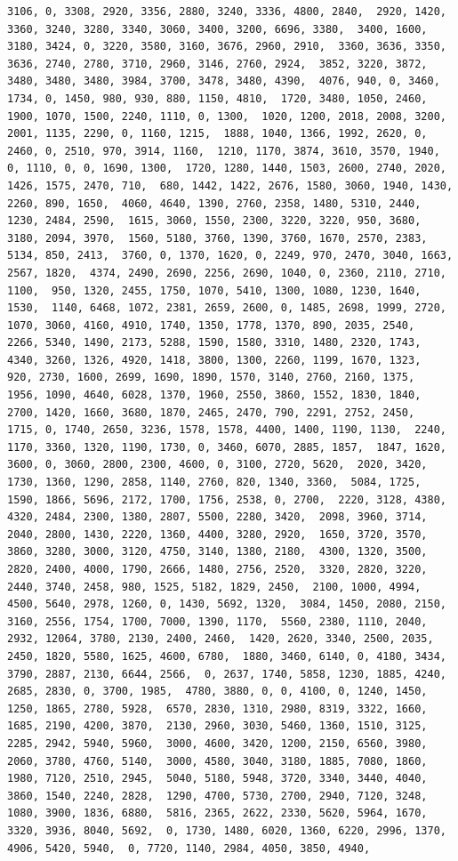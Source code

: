 \documentclass[
]{article}
\begin{document}
\begin{verbatim}
3106, 0, 3308, 2920, 3356, 2880, 3240, 3336, 4800, 2840,  2920, 1420, 3360, 3240, 3280, 3340, 3060, 3400, 3200, 6696, 3380,  3400, 1600, 3180, 3424, 0, 3220, 3580, 3160, 3676, 2960, 2910,  3360, 3636, 3350, 3636, 2740, 2780, 3710, 2960, 3146, 2760, 2924,  3852, 3220, 3872, 3480, 3480, 3480, 3984, 3700, 3478, 3480, 4390,  4076, 940, 0, 3460, 1734, 0, 1450, 980, 930, 880, 1150, 4810,  1720, 3480, 1050, 2460, 1900, 1070, 1500, 2240, 1110, 0, 1300,  1020, 1200, 2018, 2008, 3200, 2001, 1135, 2290, 0, 1160, 1215,  1888, 1040, 1366, 1992, 2620, 0, 2460, 0, 2510, 970, 3914, 1160,  1210, 1170, 3874, 3610, 3570, 1940, 0, 1110, 0, 0, 1690, 1300,  1720, 1280, 1440, 1503, 2600, 2740, 2020, 1426, 1575, 2470, 710,  680, 1442, 1422, 2676, 1580, 3060, 1940, 1430, 2260, 890, 1650,  4060, 4640, 1390, 2760, 2358, 1480, 5310, 2440, 1230, 2484, 2590,  1615, 3060, 1550, 2300, 3220, 3220, 950, 3680, 3180, 2094, 3970,  1560, 5180, 3760, 1390, 3760, 1670, 2570, 2383, 5134, 850, 2413,  3760, 0, 1370, 1620, 0, 2249, 970, 2470, 3040, 1663, 2567, 1820,  4374, 2490, 2690, 2256, 2690, 1040, 0, 2360, 2110, 2710, 1100,  950, 1320, 2455, 1750, 1070, 5410, 1300, 1080, 1230, 1640, 1530,  1140, 6468, 1072, 2381, 2659, 2600, 0, 1485, 2698, 1999, 2720,  1070, 3060, 4160, 4910, 1740, 1350, 1778, 1370, 890, 2035, 2540,  2266, 5340, 1490, 2173, 5288, 1590, 1580, 3310, 1480, 2320, 1743,  4340, 3260, 1326, 4920, 1418, 3800, 1300, 2260, 1199, 1670, 1323,  920, 2730, 1600, 2699, 1690, 1890, 1570, 3140, 2760, 2160, 1375,  1956, 1090, 4640, 6028, 1370, 1960, 2550, 3860, 1552, 1830, 1840,  2700, 1420, 1660, 3680, 1870, 2465, 2470, 790, 2291, 2752, 2450,  1715, 0, 1740, 2650, 3236, 1578, 1578, 4400, 1400, 1190, 1130,  2240, 1170, 3360, 1320, 1190, 1730, 0, 3460, 6070, 2885, 1857,  1847, 1620, 3600, 0, 3060, 2800, 2300, 4600, 0, 3100, 2720, 5620,  2020, 3420, 1730, 1360, 1290, 2858, 1140, 2760, 820, 1340, 3360,  5084, 1725, 1590, 1866, 5696, 2172, 1700, 1756, 2538, 0, 2700,  2220, 3128, 4380, 4320, 2484, 2300, 1380, 2807, 5500, 2280, 3420,  2098, 3960, 3714, 2040, 2800, 1430, 2220, 1360, 4400, 3280, 2920,  1650, 3720, 3570, 3860, 3280, 3000, 3120, 4750, 3140, 1380, 2180,  4300, 1320, 3500, 2820, 2400, 4000, 1790, 2666, 1480, 2756, 2520,  3320, 2820, 3220, 2440, 3740, 2458, 980, 1525, 5182, 1829, 2450,  2100, 1000, 4994, 4500, 5640, 2978, 1260, 0, 1430, 5692, 1320,  3084, 1450, 2080, 2150, 3160, 2556, 1754, 1700, 7000, 1390, 1170,  5560, 2380, 1110, 2040, 2932, 12064, 3780, 2130, 2400, 2460,  1420, 2620, 3340, 2500, 2035, 2450, 1820, 5580, 1625, 4600, 6780,  1880, 3460, 6140, 0, 4180, 3434, 3790, 2887, 2130, 6644, 2566,  0, 2637, 1740, 5858, 1230, 1885, 4240, 2685, 2830, 0, 3700, 1985,  4780, 3880, 0, 0, 4100, 0, 1240, 1450, 1250, 1865, 2780, 5928,  6570, 2830, 1310, 2980, 8319, 3322, 1660, 1685, 2190, 4200, 3870,  2130, 2960, 3030, 5460, 1360, 1510, 3125, 2285, 2942, 5940, 5960,  3000, 4600, 3420, 1200, 2150, 6560, 3980, 2060, 3780, 4760, 5140,  3000, 4580, 3040, 3180, 1885, 7080, 1860, 1980, 7120, 2510, 2945,  5040, 5180, 5948, 3720, 3340, 3440, 4040, 3860, 1540, 2240, 2828,  1290, 4700, 5730, 2700, 2940, 7120, 3248, 1080, 3900, 1836, 6880,  5816, 2365, 2622, 2330, 5620, 5964, 1670, 3320, 3936, 8040, 5692,  0, 1730, 1480, 6020, 1360, 6220, 2996, 1370, 4906, 5420, 5940,  0, 7720, 1140, 2984, 4050, 3850, 4940, 
\end{verbatim}
\end{document}
